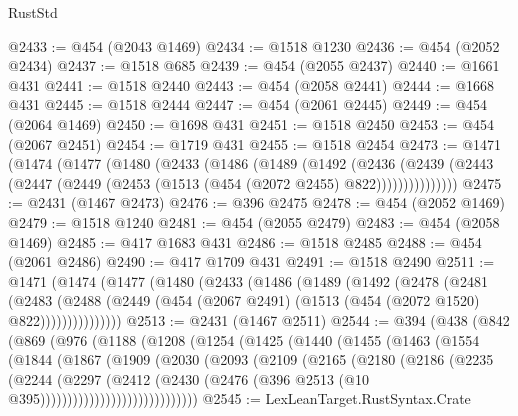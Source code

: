 \begin{lexlean}{RustStd}
\begin{coremodule}
@2433 := @454 (@2043 @1469)
@2434 := @1518 @1230
@2436 := @454 (@2052 @2434)
@2437 := @1518 @685
@2439 := @454 (@2055 @2437)
@2440 := @1661 @431
@2441 := @1518 @2440
@2443 := @454 (@2058 @2441)
@2444 := @1668 @431
@2445 := @1518 @2444
@2447 := @454 (@2061 @2445)
@2449 := @454 (@2064 @1469)
@2450 := @1698 @431
@2451 := @1518 @2450
@2453 := @454 (@2067 @2451)
@2454 := @1719 @431
@2455 := @1518 @2454
@2473 := @1471
    (@1474
      (@1477
        (@1480
          (@2433
            (@1486
              (@1489
                (@1492
                  (@2436
                    (@2439
                      (@2443 (@2447 (@2449 (@2453 (@1513 (@454 (@2072 @2455) @822)))))))))))))))
@2475 := @2431 (@1467 @2473)
@2476 := @396 @2475
@2478 := @454 (@2052 @1469)
@2479 := @1518 @1240
@2481 := @454 (@2055 @2479)
@2483 := @454 (@2058 @1469)
@2485 := @417 @1683 @431
@2486 := @1518 @2485
@2488 := @454 (@2061 @2486)
@2490 := @417 @1709 @431
@2491 := @1518 @2490
@2511 := @1471
    (@1474
      (@1477
        (@1480
          (@2433
            (@1486
              (@1489
                (@1492
                  (@2478
                    (@2481
                      (@2483
                        (@2488
                          (@2449 (@454 (@2067 @2491) (@1513 (@454 (@2072 @1520) @822)))))))))))))))
@2513 := @2431 (@1467 @2511)
@2544 := @394
    (@438
      (@842
        (@869
          (@976
            (@1188
              (@1208
                (@1254
                  (@1425
                    (@1440
                      (@1455
                        (@1463
                          (@1554
                            (@1844
                              (@1867
                                (@1909
                                  (@2030
                                    (@2093
                                      (@2109
                                        (@2165
                                          (@2180
                                            (@2186
                                              (@2235
                                                (@2244
                                                  (@2297
                                                    (@2412
                                                      (@2430
                                                        (@2476
                                                          (@396
                                                            @2513
                                                            (@10 @395)))))))))))))))))))))))))))))
@2545 := LexLeanTarget.RustSyntax.Crate

\end{coremodule}
\end{lexlean}
